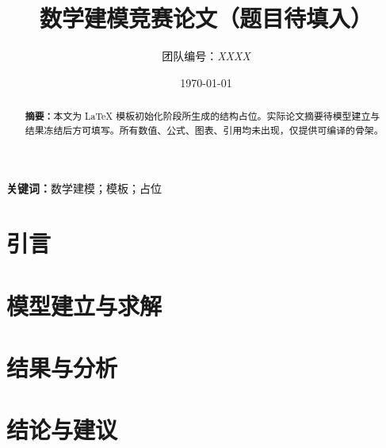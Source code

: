 \documentclass[UTF8,12pt,a4paper]{ctexart}
\title{数学建模竞赛论文（题目待填入）}
\author{团队编号：\textsl{XXXX}}
\date{\today}
\begin{document}
\maketitle

\begin{abstract}
\noindent\textbf{摘要：}本文为 LaTeX 模板初始化阶段所生成的结构占位。实际论文摘要待模型建立与结果冻结后方可填写。所有数值、公式、图表、引用均未出现，仅提供可编译的骨架。
\end{abstract}

\noindent\textbf{关键词：}数学建模；模板；占位

\newpage
\tableofcontents
\newpage

\section{引言}
\label{sec:introduction}


\section{模型建立与求解}
\label{sec:model}


\section{结果与分析}
\label{sec:results}


\section{结论与建议}
\label{sec:conclusion}


\printbibliography
\end{document}
